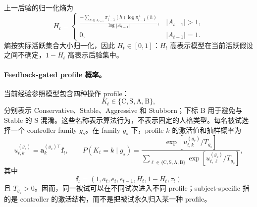 上一后验的归一化熵为
\begin{equation}
    H_t
    =
    \begin{cases}
    \displaystyle
    \frac{
        -\sum_{h\in A_{t-1}}
        \pi_{t-1}^+(h)\log\pi_{t-1}^+(h)
    }{
        \log |A_{t-1}|
    },
    &|A_{t-1}|>1,\\[12pt]
    0,&|A_{t-1}|=1.
    \end{cases}
    \label{eq:modelv2-active-entropy}
\end{equation}
熵按实际活跃集合大小归一化，因此 $H_t\in[0,1]$：$H_t$ 高表示模型在当前活跃假设之间不确定，$1-H_t$ 高表示后验集中。

\paragraph{Feedback-gated profile 概率。}
当前经验参照模型包含四种操作 profile：
\[
    K_t\in\{\mathrm C,\mathrm S,\mathrm A,\mathrm B\},
\]
分别表示 Conservative、Stable、Aggressive 和 Stubborn；下标 $\mathrm B$ 用于避免与 Stable 的 $\mathrm S$ 混淆。这些名称表示算法行为，不表示固定的人格类型。每名被试选择一个 controller family $g_s$。在 family $g_s$ 下，profile $k$ 的激活值和抽样概率为
\begin{equation}
    u_{t,k}^{(g_s)}
    =
    \mathbf a_k^{(g_s)\top}\mathbf f_t,
    \qquad
    P(K_t=k\mid g_s)
    =
    \frac{
        \exp[u_{t,k}^{(g_s)}/T_{g_s}]
    }{
        \sum_{\ell\in\{\mathrm C,\mathrm S,\mathrm A,\mathrm B\}}
        \exp[u_{t,\ell}^{(g_s)}/T_{g_s}]
    },
    \label{eq:modelv2-profile-softmax}
\end{equation}
其中
\[
    \mathbf f_t
    =
    (1,\bar a_t,\bar e_t,e_{t-1},H_t,1-H_t,\tau_t)
\]
且 $T_{g_s}>0$。因而，同一被试可以在不同试次进入不同 profile；subject-specific 指的是 controller 的激活结构，而不是把被试永久归入某一种 profile。

